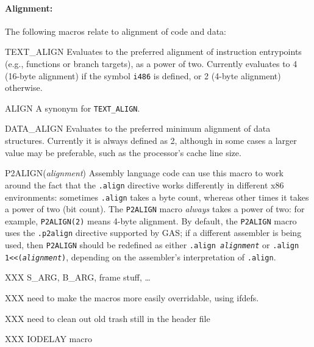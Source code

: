 \begin{apidesc}
	\paragraph{Alignment:}
	The following macros relate to alignment of code and data:
	\begin{csymlist}
	\item[TEXT_ALIGN]		
		Evaluates to the preferred alignment of instruction entrypoints
		(e.g., functions or branch targets),
		as a power of two.
		Currently evaluates to 4 (16-byte alignment)
		if the symbol {\tt i486} is defined,
		or 2 (4-byte alignment) otherwise.
	\item[ALIGN]			
		A synonym for {\tt TEXT_ALIGN}.
	\item[DATA_ALIGN]		
		Evaluates to the preferred minimum alignment of data structures.
		Currently it is always defined as 2,
		although in some cases a larger value may be preferable,
		such as the processor's cache line size.
	\item[P2ALIGN(\emph{alignment})]	
		Assembly language code can use this macro
		to work around the fact that the {\tt.align} directive
		works differently in different x86 environments:
		sometimes {\tt.align} takes a byte count,
		whereas other times it takes a power of two (bit count).
		The {\tt P2ALIGN} macro \emph{always} takes a power of two:
		for example, {\tt P2ALIGN(2)} means 4-byte alignment.
		By default, the {\tt P2ALIGN} macro
		uses the {\tt.p2align} directive supported by GAS;
		if a different assembler is being used,
		then {\tt P2ALIGN} should be redefined as
		either {\tt.align \emph{alignment}}
		or {\tt.align 1<<(\emph{alignment})},
		depending on the assembler's interpretation of {\tt.align}.
	\end{csymlist}

	XXX S_ARG, B_ARG, frame stuff, \ldots{}

	XXX need to make the macros more easily overridable, using ifdefs.

	XXX need to clean out old trash still in the header file

        XXX IODELAY macro
\end{apidesc}

